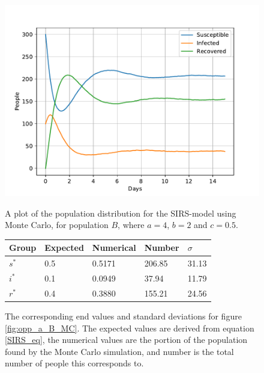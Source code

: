 \documentclass[a4paper]{article}
\begin{document}
	\begin{figure}[!htb]
		\centering
		\begin{minipage}{0.49\textwidth}
			\centering
			\includegraphics[scale=0.6]{../plots/opp_a_B_MC.pdf}
			\caption{A plot of the population distribution for the SIRS-model using Monte Carlo, for population $B$, where $a=4$, $b=2$ and $c=0.5$. }\label{fig:opp_a_B_MC}
		\end{minipage}
		\begin{minipage}{0.49\textwidth}
			\centering
			\captionsetup{type=table} %
			\begin{tabular}{|l|l|l|l|l|}
				\hline
				Group & Expected & Numerical   & Number  & $\sigma$\\ \hline
				$s^*$ & 0.5 & 0.5171 & 206.85 & 31.13\\ \hline
				$i^*$ & 0.1 & 0.0949 & 37.94 & 11.79\\ \hline
				$r^*$ & 0.4 & 0.3880 & 155.21 & 24.56\\ \hline
			\end{tabular}
			\caption{The corresponding end values and standard deviations for figure \ref{fig:opp_a_B_MC}. The expected values are derived from equation \ref{SIRS_eq}, the numerical values are the portion of the population found by the Monte Carlo simulation, and number is the total number of people this corresponds to.}\label{tab:opp_a_B_mc}
		\end{minipage}
	\end{figure}
	
\end{document}
